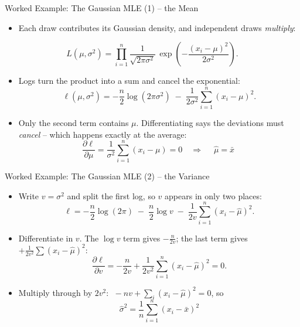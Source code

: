 \begin{frame}{Worked Example: The Gaussian MLE (1) -- the Mean}
\small
\begin{itemize}
  \item Each draw contributes its Gaussian density, and independent draws \emph{multiply}:
\end{itemize}
\[
L(\mu, \sigma^2) = \prod_{i=1}^{n} \frac{1}{\sqrt{2\pi\sigma^2}}\,
\exp\!\left(-\frac{(x_i-\mu)^2}{2\sigma^2}\right).
\]
\pause
\begin{itemize}
  \item Logs turn the product into a sum and cancel the exponential:
  \[
    \ell(\mu, \sigma^2) = -\frac{n}{2}\log(2\pi\sigma^2) \;-\; \frac{1}{2\sigma^2}\sum_{i=1}^n (x_i - \mu)^2 .
  \]
  \pause
  \item Only the second term contains $\mu$. Differentiating says the deviations must \emph{cancel} -- which happens exactly at the average:
  \[
    \frac{\partial \ell}{\partial \mu} = \frac{1}{\sigma^2}\sum_{i=1}^n (x_i - \mu) = 0
    \quad\Longrightarrow\quad \boxed{\;\hat{\mu} = \bar{x}\;}
  \]
\vspace{-0.6em}
\end{itemize}
\end{frame}

\begin{frame}{Worked Example: The Gaussian MLE (2) -- the Variance}
\small
\begin{itemize}
  \item Write $v = \sigma^2$ and split the first log, so $v$ appears in only two places:
  \[
    \ell = -\frac{n}{2}\log(2\pi) \;-\; \frac{n}{2}\log v \;-\; \frac{1}{2v}\sum_{i=1}^n (x_i - \hat{\mu})^2 .
  \]
  \pause
  \item Differentiate in $v$. The $\log v$ term gives $-\tfrac{n}{2v}$; the last term gives $+\tfrac{1}{2v^2}\sum(x_i-\hat\mu)^2$:
  \[
    \frac{\partial \ell}{\partial v} = -\frac{n}{2v} + \frac{1}{2v^2}\sum_{i=1}^n (x_i - \hat{\mu})^2 = 0 .
  \]
  \pause
  \item Multiply through by $2v^2$: $\;-nv + \sum_i (x_i-\hat\mu)^2 = 0$, so
  \[
    \boxed{\;\hat{\sigma}^2 = \frac{1}{n}\sum_{i=1}^n (x_i - \bar{x})^2\;}
  \]
\vspace{-0.6em}
\end{itemize}
\end{frame}

